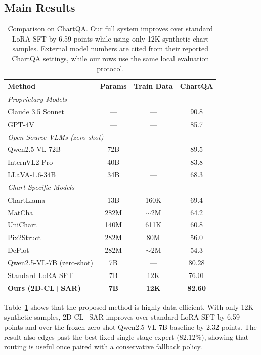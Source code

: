 \documentclass[journal]{IEEEtran}
\newcommand{\method}{2D-CL}
\newcommand{\sar}{SAR}
\begin{document}
\subsection{Main Results}
\label{sec:main_results}
\begin{table}[!t]
\centering
\small
\begin{tabular}{lccc}
\toprule
\textbf{Method} & \textbf{Params} & \textbf{Train Data} & \textbf{ChartQA} \\
\midrule
\multicolumn{4}{l}{\textit{Proprietary Models}} \\
Claude 3.5 Sonnet & --- & --- & 90.8 \\
GPT-4V & --- & --- & 85.7 \\
\midrule
\multicolumn{4}{l}{\textit{Open-Source VLMs (zero-shot)}} \\
Qwen2.5-VL-72B & 72B & --- & 89.5 \\
InternVL2-Pro & 40B & --- & 83.8 \\
LLaVA-1.6-34B & 34B & --- & 68.3 \\
\midrule
\multicolumn{4}{l}{\textit{Chart-Specific Models}} \\
ChartLlama & 13B & 160K & 69.4 \\
MatCha & 282M & $\sim$2M & 64.2 \\
UniChart & 140M & 611K & 60.8 \\
Pix2Struct & 282M & 80M & 56.0 \\
DePlot & 282M & $\sim$2M & 54.3 \\
\midrule
Qwen2.5-VL-7B (zero-shot) & 7B & --- & 80.28 \\
Standard LoRA SFT & 7B & 12K & 76.01 \\
\textbf{Ours (\method{}+\sar{})} & \textbf{7B} & \textbf{12K} & \textbf{82.60} \\
\bottomrule
\end{tabular}
\vspace{4pt}
\caption{Comparison on ChartQA. Our full system improves over standard LoRA SFT by 6.59 points while using only 12K synthetic chart samples. External model numbers are cited from their reported ChartQA settings, while our rows use the same local evaluation protocol.}
\label{tab:sota}
\end{table}

Table~\ref{tab:sota} shows that the proposed method is highly data-efficient.
With only 12K synthetic samples, \method{}+\sar{} improves over standard LoRA SFT by 6.59 points and over the frozen zero-shot Qwen2.5-VL-7B baseline by 2.32 points.
The result also edges past the best fixed single-stage expert (82.12\%), showing that routing is useful once paired with a conservative fallback policy.
\end{document}
